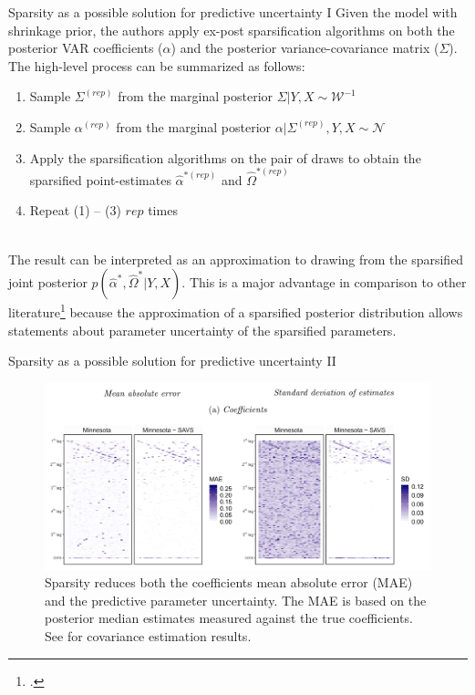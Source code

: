 \begin{frame}{Sparsity as a possible solution for predictive uncertainty I}
    Given the model with shrinkage prior, the authors apply ex-post sparsification algorithms on both the posterior VAR coefficients ($\alpha$) and the posterior variance-covariance matrix ($\Sigma$). The high-level process can be summarized as follows:
    
    \begin{enumerate}
        \item Sample $\Sigma^{(rep)}$ from the marginal posterior $\Sigma | Y,X \sim \mathcal{W}^{-1}$
        \item Sample $\alpha^{(rep)}$ from the marginal posterior $\alpha | \Sigma^{(rep)},Y,X \sim \mathcal{N}$
        \item Apply the sparsification algorithms on the pair of draws to obtain the sparsified point-estimates $\hat{\alpha}^{*(rep)}$ and $\hat{\Omega}^{*(rep)}$
        \item Repeat (1) – (3) $rep$ times
    \end{enumerate}
    ~\\
    The result can be interpreted as an approximation to drawing from the sparsified joint posterior $p(\hat{\alpha}^* , \hat{\Omega}^* | Y,X)$. This is a major advantage in comparison to other literature\footcite{hahn_decoupling_2015} because the approximation of a sparsified posterior distribution allows statements about parameter uncertainty of the sparsified parameters.
\end{frame}

\begin{frame}{Sparsity as a possible solution for predictive uncertainty II}
    \begin{figure}
        \centering
        \includegraphics[width=1\textwidth]{plots/sparsity_coefficients.png}
        \caption{Sparsity reduces both the coefficients mean absolute error (MAE) and the predictive parameter uncertainty. The MAE is based on the posterior median estimates measured against the true coefficients. See  for covariance estimation results.}
        \label{fig:dense_vs_sparse_coefficients}
    \end{figure}
\end{frame}

